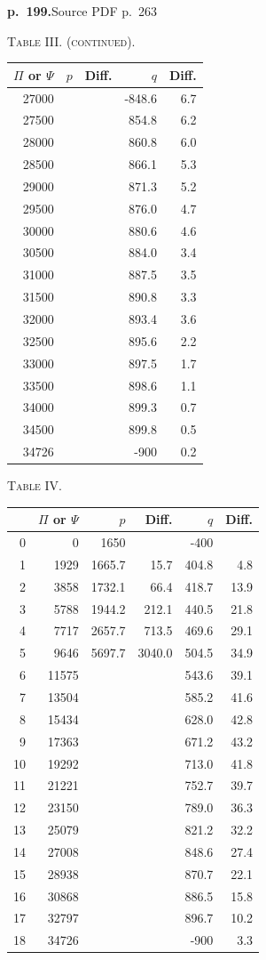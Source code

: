 \documentclass[11pt,a4paper]{article}
\newcommand{\sourcepage}[2]{\par\bigskip\noindent\textbf{p.~#1.}\hfill{\footnotesize Source PDF p.~#2}\par\nobreak\medskip}
\begin{document}
\sourcepage{199}{263}
\begin{center}
\textsc{Table III. (continued).}\par
\begin{tabular}{rrrrr}
\toprule
$\Pi$ or $\Psi$&$p$&Diff.&$q$&Diff.\\
\midrule
27000&&&-848.6&6.7\\
27500&&&854.8&6.2\\
28000&&&860.8&6.0\\
28500&&&866.1&5.3\\
29000&&&871.3&5.2\\
29500&&&876.0&4.7\\
30000&&&880.6&4.6\\
30500&&&884.0&3.4\\
31000&&&887.5&3.5\\
31500&&&890.8&3.3\\
32000&&&893.4&3.6\\
32500&&&895.6&2.2\\
33000&&&897.5&1.7\\
33500&&&898.6&1.1\\
34000&&&899.3&0.7\\
34500&&&899.8&0.5\\
34726&&&-900&0.2\\
\bottomrule
\end{tabular}
\end{center}

\begin{center}
\textsc{Table IV.}\par
\begin{tabular}{rrrrrr}
\toprule
&$\Pi$ or $\Psi$&$p$&Diff.&$q$&Diff.\\
\midrule
0&0&1650&&-400&\\
1&1929&1665.7&15.7&404.8&4.8\\
2&3858&1732.1&66.4&418.7&13.9\\
3&5788&1944.2&212.1&440.5&21.8\\
4&7717&2657.7&713.5&469.6&29.1\\
5&9646&5697.7&3040.0&504.5&34.9\\
6&11575&&&543.6&39.1\\
7&13504&&&585.2&41.6\\
8&15434&&&628.0&42.8\\
9&17363&&&671.2&43.2\\
10&19292&&&713.0&41.8\\
11&21221&&&752.7&39.7\\
12&23150&&&789.0&36.3\\
13&25079&&&821.2&32.2\\
14&27008&&&848.6&27.4\\
15&28938&&&870.7&22.1\\
16&30868&&&886.5&15.8\\
17&32797&&&896.7&10.2\\
18&34726&&&-900&3.3\\
\bottomrule
\end{tabular}
\end{center}
\end{document}
